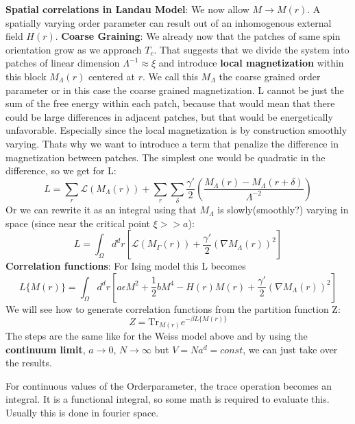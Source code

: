 	\textbf{Spatial correlations in Landau Model}:
	We now allow $M \rightarrow M(r)$. A spatially varying order parameter can result out of an inhomogenous external field $H(r)$.
	\textbf{Coarse Graining}: We already now that the patches of same spin orientation grow as we approach $T_c$. That suggests that we divide the system into patches of linear dimension $\Lambda^{-1} \approx \xi$ and introduce \textbf{local magnetization} within this block $M_\Lambda(r)$ centered at $r$. We call this $M_\Lambda$ the coarse grained order parameter or in this case the coarse grained magnetization. L cannot be just the sum of the free energy within each patch, because that would mean that there could be large differences in adjacent patches, but that would be energetically unfavorable. Especially since the local magnetization is by construction smoothly varying. Thats why we want to introduce a term that penalize the difference in magnetization between patches. The simplest one would be quadratic in the difference, so we get for L:
	\begin{equation}
		L =	\sum_r \mathcal{L}(M_\Lambda(r)) + \sum_r \sum_\delta \frac{\gamma'}{2} \left(\frac{M_\Lambda(r) - M_\Lambda(r + \delta)}{\Lambda^{-2}}\right)
	\end{equation}
	Or we can rewrite it as an integral using that $M_\Lambda$ is slowly(smoothly?) varying in space (since near the critical point $\xi >> a$):
	\begin{equation}
		L =	\int_\Omega d^d{r} \left[\mathcal{L} (M_\Gamma (r)) + \frac{\gamma'}{2} (\nabla M_\Lambda(r))^2\right]
	\end{equation}
	\textbf{Correlation functions}: For Ising model this L	becomes
	\begin{equation}
		L\lbrace M(r) \rbrace =	\int_\Omega d^d{r} \left[ a\epsilon M^2 + \frac{1}{2}b M^4 - H(r) M(r) + \frac{\gamma'}{2} (\nabla M_\Lambda(r))^2\right]
	\end{equation}
	We will see how to generate correlation functions from the partition function Z:
	\begin{equation}
		Z =	\text{Tr}_{M(r)} e^{-\beta L\lbrace M(r) \rbrace}
	\end{equation}
	The steps are the same like for the Weiss model above and by using the \textbf{continuum limit}, $a \rightarrow 0$, $N \rightarrow \infty$ but $V =	Na^d = const$, we can just take over the results.
	
	For continuous values of the Orderparameter, the trace operation becomes an integral. It is a functional integral, so some math is required to evaluate this. Usually this is done in fourier space.
	
